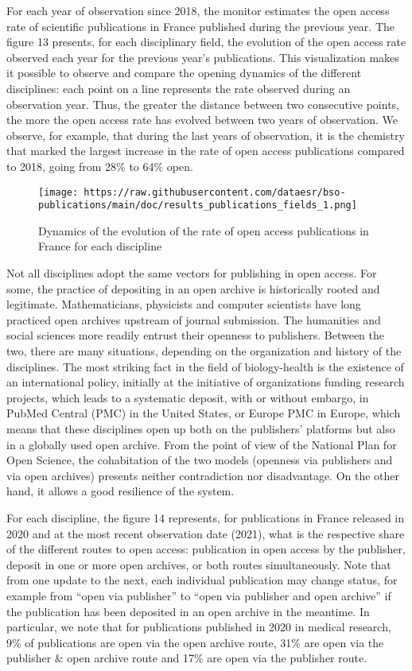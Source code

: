 \documentclass[
]{article}
\begin{document}
For each year of observation since 2018, the monitor estimates the open
access rate of scientific publications in France published during the
previous year. The figure 13 presents, for each disciplinary field, the
evolution of the open access rate observed each year for the previous
year's publications. This visualization makes it possible to observe and
compare the opening dynamics of the different disciplines: each point on
a line represents the rate observed during an observation year. Thus,
the greater the distance between two consecutive points, the more the
open access rate has evolved between two years of observation. We
observe, for example, that during the last years of observation, it is
the chemistry that marked the largest increase in the rate of open
access publications compared to 2018, going from 28\% to 64\% open.

\begin{figure}
\centering
\texttt{[image: https://raw.githubusercontent.com/dataesr/bso-publications/main/doc/results\_publications\_fields\_1.png]}
\caption{Dynamics of the evolution of the rate of open access
publications in France for each discipline}
\end{figure}

Not all disciplines adopt the same vectors for publishing in open
access. For some, the practice of depositing in an open archive is
historically rooted and legitimate. Mathematicians, physicists and
computer scientists have long practiced open archives upstream of
journal submission. The humanities and social sciences more readily
entrust their openness to publishers. Between the two, there are many
situations, depending on the organization and history of the
disciplines. The most striking fact in the field of biology-health is
the existence of an international policy, initially at the initiative of
organizations funding research projects, which leads to a systematic
deposit, with or without embargo, in PubMed Central (PMC) in the United
States, or Europe PMC in Europe, which means that these disciplines open
up both on the publishers' platforms but also in a globally used open
archive. From the point of view of the National Plan for Open Science,
the cohabitation of the two models (openness via publishers and via open
archives) presents neither contradiction nor disadvantage. On the other
hand, it allows a good resilience of the system.

For each discipline, the figure 14 represents, for publications in
France released in 2020 and at the most recent observation date (2021),
what is the respective share of the different routes to open access:
publication in open access by the publisher, deposit in one or more open
archives, or both routes simultaneously. Note that from one update to
the next, each individual publication may change status, for example
from ``open via publisher'' to ``open via publisher and open archive''
if the publication has been deposited in an open archive in the
meantime. In particular, we note that for publications published in 2020
in medical research, 9\% of publications are open via the open archive
route, 31\% are open via the publisher \& open archive route and 17\%
are open via the publisher route.
\end{document}
